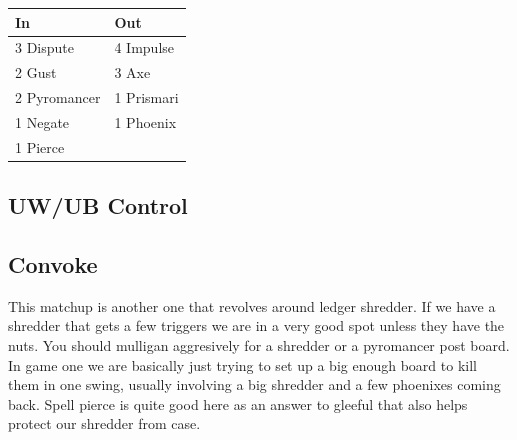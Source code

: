 \documentclass[12pt]{article}
\begin{document}
\begin{center}
    \begin{tabular}{|l|l|}
        \hline
        In           & Out        \\
        \hline
        3 Dispute    & 4 Impulse  \\
        2 Gust       & 3 Axe      \\
        2 Pyromancer & 1 Prismari \\
        1 Negate     & 1 Phoenix  \\
        1 Pierce     &            \\
        \hline
    \end{tabular}
\end{center}

\subsection{UW/UB Control}

\subsection{Convoke}
This matchup is another one that revolves around ledger shredder. If we have a shredder that gets a few triggers we are in a very good spot unless they have the nuts. You should mulligan aggresively for a shredder or a pyromancer post board. In game one we are basically just trying to set up a big enough board to kill them in one swing, usually involving a big shredder and a few phoenixes coming back. Spell pierce is quite good here as an answer to gleeful that also helps protect our shredder from case.
\end{document}
